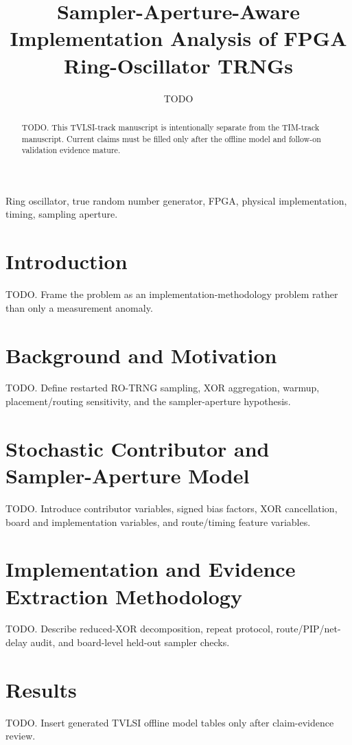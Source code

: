 \documentclass[journal]{IEEEtran}
\title{Sampler-Aperture-Aware Implementation Analysis of FPGA Ring-Oscillator TRNGs}
\author{TODO}
\begin{document}
\maketitle

\begin{abstract}
TODO. This TVLSI-track manuscript is intentionally separate from the TIM-track manuscript. Current claims must be filled only after the offline model and follow-on validation evidence mature.
\end{abstract}

\begin{IEEEkeywords}
Ring oscillator, true random number generator, FPGA, physical implementation, timing, sampling aperture.
\end{IEEEkeywords}

\section{Introduction}
TODO. Frame the problem as an implementation-methodology problem rather than only a measurement anomaly.

\section{Background and Motivation}
TODO. Define restarted RO-TRNG sampling, XOR aggregation, warmup, placement/routing sensitivity, and the sampler-aperture hypothesis.

\section{Stochastic Contributor and Sampler-Aperture Model}
TODO. Introduce contributor variables, signed bias factors, XOR cancellation, board and implementation variables, and route/timing feature variables.

\section{Implementation and Evidence Extraction Methodology}
TODO. Describe reduced-XOR decomposition, repeat protocol, route/PIP/net-delay audit, and board-level held-out sampler checks.

\section{Results}
TODO. Insert generated TVLSI offline model tables only after claim-evidence review.
\end{document}

